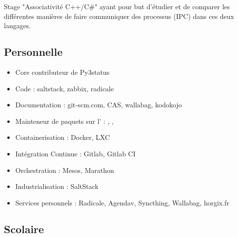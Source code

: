\documentclass[10pt,a4paper]{moderncv}
\begin{document}
{Stage "Associativité C++/C\#" ayant pour but d'étudier et de comparer les
différentes manières de faire communiquer des processus (IPC) dans ces deux
langages.}

\bigskip
\subsection{Personnelle}

{
  \begin{itemize}
    \item Core contributeur de Py3status
    \item Code : saltstack, zabbix, radicale
    \item Documentation : git-scm.com, CAS, wallabag, kodokojo
    \item Mainteneur de paquets sur l' :
      ,
      ,
  \end{itemize}
}

{\begin{itemize}
  \item Containerisation : Docker, LXC
  \item Intégration Continue : Gitlab, Gitlab CI
  \item Orchestration : Mesos, Marathon
  \item Industrialisation : SaltStack
  \item Services personnels : Radicale, Agendav, Syncthing, Wallabag, horgix.fr
\end{itemize}
}

\subsection{Scolaire}

\end{document}
